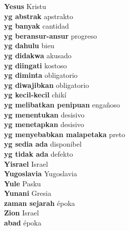 \textbf{ Yesus  } Kristu \\
\textbf{ yg abstrak  } apstrakto \\
\textbf{ yg banyak  } cantidad \\
\textbf{ yg beransur-ansur  } progreso \\
\textbf{ yg dahulu  } bieu \\
\textbf{ yg didakwa  } akusado \\
\textbf{ yg diingati  } kostoso \\
\textbf{ yg diminta  } obligatorio \\
\textbf{ yg diwajibkan  } obligatorio \\
\textbf{ yg kecil-kecil  } chikí \\
\textbf{ yg melibatkan penipuan  } engañoso \\
\textbf{ yg menentukan  } desisivo \\
\textbf{ yg menetapkan  } desisivo \\
\textbf{ yg menyebabkan malapetaka  } preto \\
\textbf{ yg sedia ada  } disponibel \\
\textbf{ yg tidak ada  } defekto \\
\textbf{ Yisrael  } Israel \\
\textbf{ Yugoslavia  } Yugoslavia \\
\textbf{ Yule  } Pasku \\
\textbf{ Yunani  } Gresia \\
\textbf{ zaman sejarah  } époka \\
\textbf{ Zion  } Israel \\
\textbf{abad } époka \\
